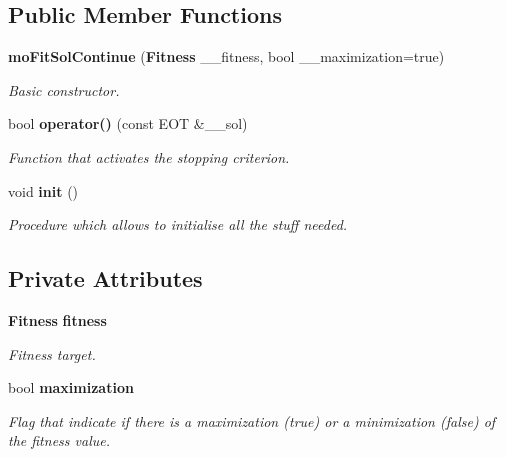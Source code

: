 \subsection*{Public Member Functions}
\begin{CompactItemize}
\item 
{\bf moFitSolContinue} ({\bf Fitness} \_\-\_\-fitness, bool \_\-\_\-maximization=true)
\begin{CompactList}\small\item\em Basic constructor. \item\end{CompactList}\item 
bool {\bf operator()} (const EOT \&\_\-\_\-sol)
\begin{CompactList}\small\item\em Function that activates the stopping criterion. \item\end{CompactList}\item 
void {\bf init} ()\label{classmo_fit_sol_continue_670bd895b4edfcd3aebb40d2295d7f7c}

\begin{CompactList}\small\item\em Procedure which allows to initialise all the stuff needed. \item\end{CompactList}\end{CompactItemize}
\subsection*{Private Attributes}
\begin{CompactItemize}
\item 
{\bf Fitness} {\bf fitness}\label{classmo_fit_sol_continue_87d0ba8f2f76f61c89317eed5f094dfc}

\begin{CompactList}\small\item\em Fitness target. \item\end{CompactList}\item 
bool {\bf maximization}
\begin{CompactList}\small\item\em Flag that indicate if there is a maximization (true) or a minimization (false) of the fitness value. \item\end{CompactList}\end{CompactItemize}



